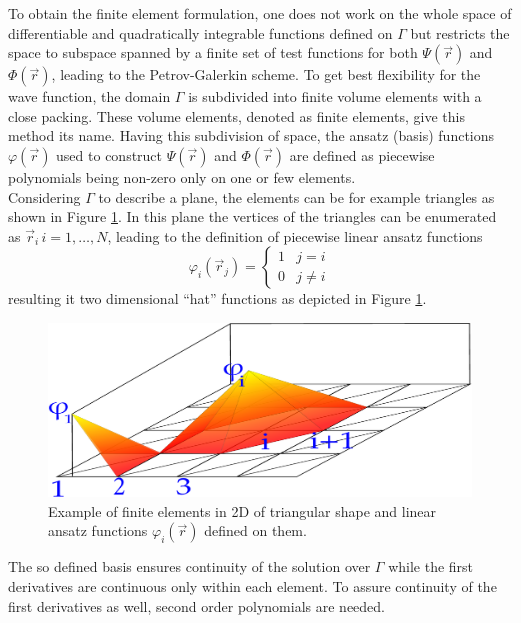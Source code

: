 To obtain the finite element formulation, one does not work on the whole space of differentiable and quadratically integrable functions defined on $\Gamma$ but restricts the space to subspace spanned by a finite set of test functions for both $\Psi(\vec{r})$ and $\Phi(\vec{r})$, leading to the Petrov-Galerkin scheme.
To get best flexibility for the wave function, the domain $\Gamma$ is subdivided into finite volume elements with a close packing.
These volume elements, denoted as finite elements, give this method its name.
Having this subdivision of space, the ansatz (basis) functions $\varphi(\vec{r})$ used to construct $\Psi(\vec{r})$ and $\Phi(\vec{r})$ are defined as piecewise polynomials being non-zero only on one or few elements.\\
Considering $\Gamma$ to describe a plane, the elements can be for example triangles as shown in Figure \ref{fig:2Del}.
In this plane the vertices of the triangles can be enumerated as $\vec{r}_i\, i=1,\hdots ,N $, leading to the definition of piecewise linear ansatz functions
\begin{equation}\label{eq:femAnsatz}
   \varphi_i(\vec{r}_j)=
           \begin{cases} 1  & j=i \\
                         0  & j\neq i \end{cases}
\end{equation}
resulting it two dimensional ``hat'' functions as depicted in Figure \ref{fig:2Del}.
\begin{figure}
   \includegraphics[width=.75\textwidth]{Figures/FEM2d-crop}
   \caption{Example of finite elements in 2D of triangular shape and linear ansatz functions $\varphi_i(\vec{r})$ defined on them.}
   \label{fig:2Del}
\end{figure}
The so defined basis ensures continuity of the solution over $\Gamma$ while the first derivatives are continuous only within each element.
To assure continuity of the first derivatives as well, second order polynomials are needed.

